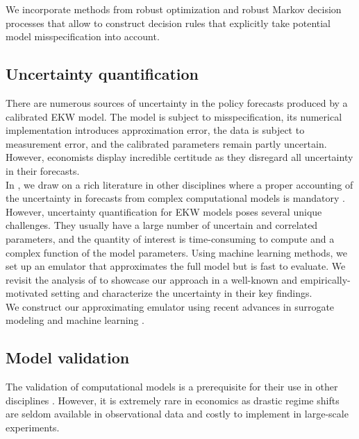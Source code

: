 \noindent We incorporate methods from robust optimization \citep{Ben-Tal.2009, Rahimian.2019, Wiesemann.2014} and robust Markov decision processes \citep{Iyengar.2005, Nilim.2005} that allow to construct decision rules that explicitly take potential model misspecification into account.
\subsection{Uncertainty quantification}
There are numerous sources of uncertainty in the policy forecasts produced by a calibrated EKW model. The model is subject to misspecification, its numerical implementation introduces approximation error, the data is subject to measurement error, and the calibrated parameters remain partly uncertain. However, economists display incredible certitude as they disregard all uncertainty \citep{Manski.2013} in their forecasts.\\

\noindent In \citet{Eisenhauer.2020d}, we draw on a rich literature in other disciplines where a proper accounting of the uncertainty in forecasts from complex computational models is mandatory \citep{Saltelli.2004, Saltelli.2008, Smith.2014}. However, uncertainty quantification for EKW models poses several unique challenges. They usually have a large number of uncertain and correlated parameters, and the quantity of interest is time-consuming to compute and a complex function of the model parameters. Using machine learning methods, we set up an emulator that approximates the full model but is fast to evaluate. We revisit the analysis of \citep{Keane.1994, Keane.1997} to showcase our approach in a well-known and empirically-motivated setting and characterize the uncertainty in their key findings.\\

\noindent We construct our approximating emulator using recent advances in surrogate modeling \citep{Forrester.2008} and machine learning \citep{Hastie.2008, Murphy.2012}.
\subsection{Model validation}
The validation of computational models is a prerequisite for their use in other disciplines \citep{Adams.2012, Oberkampf.2010}. However, it is extremely rare in economics as drastic regime shifts are seldom available in observational data and costly to implement in large-scale experiments.\\

